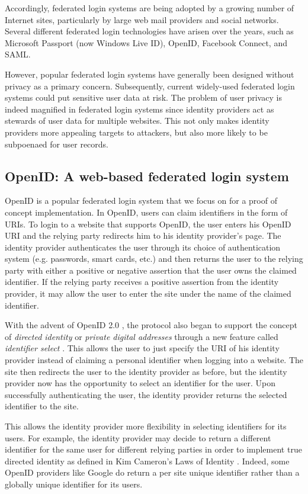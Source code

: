 \documentclass{llncs}
\begin{document}
Accordingly, federated login systems are being adopted by a growing
number of Internet sites, particularly by large web mail providers and
social networks.  Several different federated login technologies have
arisen over the years, such as Microsoft Passport (now Windows Live
ID), OpenID, Facebook Connect, and SAML.

However, popular federated login systems have generally been designed
without privacy as a primary concern. Subsequently, current
widely-used federated login systems could put sensitive user data at
risk. The problem of user privacy is indeed magnified in federated
login systems since identity providers act as stewards of user data
for multiple websites. This not only makes identity providers more
appealing targets to attackers, but also more likely to be subpoenaed
for user records.

\subsection{OpenID: A web-based federated login system}

OpenID is a popular federated login system that we focus on for a
proof of concept implementation. In OpenID, users can claim
identifiers in the form of URIs. To login to a website that supports
OpenID, the user enters his OpenID URI and the relying party redirects
him to his identity provider's page. The identity provider
authenticates the user through its choice of authentication system
(e.g. passwords, smart cards, etc.) and then returns the user to the
relying party with either a positive or negative assertion that the
user owns the claimed identifier. If the relying party receives a
positive assertion from the identity provider, it may allow the user
to enter the site under the name of the claimed identifier.

With the advent of OpenID 2.0 \cite{OID2}, the protocol also began to
support the concept of \emph{directed identity} \cite{Cam06} or
\emph{private digital addresses} through a new feature called
\emph{identifier select} \cite{RR06}.  This allows the user to just
specify the URI of his identity provider instead of claiming a
personal identifier when logging into a website. The site then
redirects the user to the identity provider as before, but the
identity provider now has the opportunity to select an identifier for
the user. Upon successfully authenticating the user, the identity
provider returns the selected identifier to the site.

This allows the identity provider more flexibility in selecting
identifiers for its users. For example, the identity provider may
decide to return a different identifier for the same user for
different relying parties in order to implement true directed identity
as defined in Kim Cameron's Laws of Identity \cite{Cam06}. Indeed,
some OpenID providers like Google do return a per site unique
identifier rather than a globally unique identifier for its users.
\end{document}
